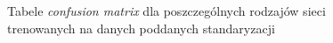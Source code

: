 \documentclass[polish,12pt]{aghthesis}
\begin{document}
\begin{figure}[H]%
    \begin{adjustbox}{minipage=1.0\paperwidth, pagecenter}
    \centering
    \qquad
    \end{adjustbox}
\end{figure}
\begin{figure}[h!]%
    \ContinuedFloat
    \begin{adjustbox}{minipage=1.0\paperwidth, pagecenter}
    \centering
    \end{adjustbox}
    \label{fig:std-matrices}
    \caption{Tabele \textit{confusion matrix} dla poszczególnych rodzajów sieci trenowanych na danych poddanych standaryzacji}
\end{figure}
\end{document}
